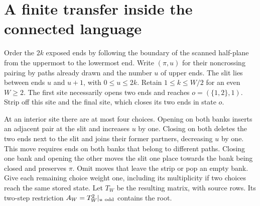 \documentclass[11pt]{article}
\begin{document}
\section{A finite transfer inside the connected language}\label{physical}
Order the \(2k\) exposed ends by following the boundary of the scanned half-plane from the uppermost to the lowermost end. Write \((\pi,u)\) for their noncrossing pairing by paths already drawn and the number \(u\) of upper ends. The slit lies between ends \(u\) and \(u+1\), with \(0\le u\le 2k\). Retain \(1\le k\le W/2\) for an even \(W\ge2\). The first site necessarily opens two ends and reaches \(o=(\{1,2\},1)\). Strip off this site and the final site, which closes its two ends in state \(o\).

At an interior site there are at most four choices. Opening on both banks inserts an adjacent pair at the slit and increases \(u\) by one. Closing on both deletes the two ends next to the slit and joins their former partners, decreasing \(u\) by one. This move requires ends on both banks that belong to different paths. Closing one bank and opening the other moves the slit one place towards the bank being closed and preserves \(\pi\). Omit moves that leave the strip or pop an empty bank. Give each remaining choice weight one, including its multiplicity if two choices reach the same stored state. Let \(T_W\) be the resulting matrix, with source rows. Its two-step restriction \(A_W=T_W^2|_{u\ {\rm odd}}\) contains the root.
\end{document}
